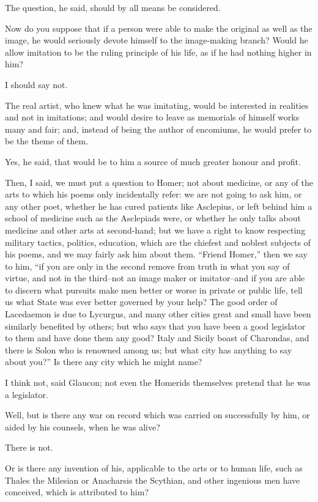 The question, he said, should by all means be considered.

Now do you suppose that if a person were able to make the original as
well as the image, he would seriously devote himself to the image-making
branch? Would he allow imitation to be the ruling principle of his life,
as if he had nothing higher in him?

I should say not.

The real artist, who knew what he was imitating, would be interested in
realities and not in imitations; and would desire to leave as memorials
of himself works many and fair; and, instead of being the author of
encomiums, he would prefer to be the theme of them.

Yes, he said, that would be to him a source of much greater honour and
profit.

Then, I said, we must put a question to Homer; not about medicine, or
any of the arts to which his poems only incidentally refer: we are not
going to ask him, or any other poet, whether he has cured patients
like Asclepius, or left behind him a school of medicine such as the
Asclepiads were, or whether he only talks about medicine and other arts
at second-hand; but we have a right to know respecting military tactics,
politics, education, which are the chiefest and noblest subjects of his
poems, and we may fairly ask him about them. ``Friend Homer,'' then we say
to him, ``if you are only in the second remove from truth in what you say
of virtue, and not in the third--not an image maker or imitator--and
if you are able to discern what pursuits make men better or worse in
private or public life, tell us what State was ever better governed by
your help? The good order of Lacedaemon is due to Lycurgus, and many
other cities great and small have been similarly benefited by others;
but who says that you have been a good legislator to them and have done
them any good? Italy and Sicily boast of Charondas, and there is Solon
who is renowned among us; but what city has anything to say about you?''
Is there any city which he might name?

I think not, said Glaucon; not even the Homerids themselves pretend that
he was a legislator.

Well, but is there any war on record which was carried on successfully
by him, or aided by his counsels, when he was alive?

There is not.

Or is there any invention of his, applicable to the arts or to human
life, such as Thales the Milesian or Anacharsis the Scythian, and other
ingenious men have conceived, which is attributed to him?

